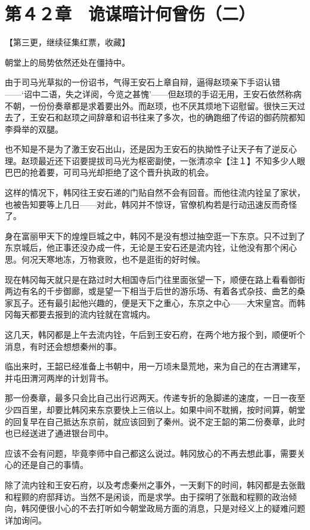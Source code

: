 \section{第４２章　诡谋暗计何曾伤（二）}

【第三更，继续征集红票，收藏】

朝堂上的局势依然还处在僵持中。

由于司马光草拟的一份诏书，气得王安石上章自辩，逼得赵顼亲下手诏认错——‘诏中二语，失之详阅，今览之甚愧’——但赵顼的手诏无用，王安石依然称病不朝，一份份奏章都是求着要出外。而赵顼，也不厌其烦地下诏慰留。很快三天过去了，王安石和赵顼之间辞章和诏书往来了多次，也的确跑细了传诏的御药院都知李舜举的双腿。

也不知是不是为了激王安石出山，还是因为王安石的执拗性子让天子有了逆反心理。赵顼最近还下诏要提拔司马光为枢密副使，一张清凉伞【注１】不知多少人眼巴巴的抢着要，可司马光却拒绝了这个晋升执政的机会。

这样的情况下，韩冈往王安石递的门贴自然不会有回音。而他往流内铨呈了家状，也被告知要等上几日——对此，韩冈并不惊讶，官僚机构若是行动迅速反而奇怪了。

身在富丽甲天下的煌煌巨城之中，韩冈不是没有想过抽空逛一下东京。只不过到了东京城后，他正事还没办成一件，无论是王安石还是流内铨，让他没有那个闲心思。何况天寒地冻，万物衰败，也不是逛街的好时候。

现在韩冈每天就只是在路过时大相国寺后门往里面张望一下，顺便在路上看看御街两边有名的千步御廊，或是望一下相当于后世的游乐场、有着各式杂技、曲艺的桑家瓦子。还有最引起他兴趣的，便是天下之重心，东京之中心——大宋皇宫。而韩冈每天都要去报到的流内铨就在宫城内。

这几天，韩冈都是上午去流内铨，午后到王安石府，在两个地方报个到，顺便听个消息，有时还会想想秦州的事。

临出来时，王韶已经准备上书朝中，用一万顷未垦荒地，来为自己的在古渭建军，并屯田渭河两岸的计划背书。

那一份奏章，最多只会比自己出行迟两天。传递专折的急脚递的速度，一日一夜至少四百里，却要比韩冈来东京要快上三倍以上。如果中间不耽搁，按时间算，朝堂的回复早在自己抵达东京前，就应该回到了秦州。说不定王韶的第二份奏章，此时也已经送进了通进银台司中。

应该不会有问题，毕竟李师中自己都这么说过。韩冈放心的不再去想此事，需要关心的还是自己的事情。

除了流内铨和王安石府，以及考虑秦州之事外，一天剩下的时间，韩冈都是去张戬和程颢的府邸拜访。当然不是闲谈，而是求学。由于探明了张戬和程颢的政治倾向，韩冈便很小心的不去打听如今朝堂政局方面的消息，只是对经义上的疑难问题详加询问。

